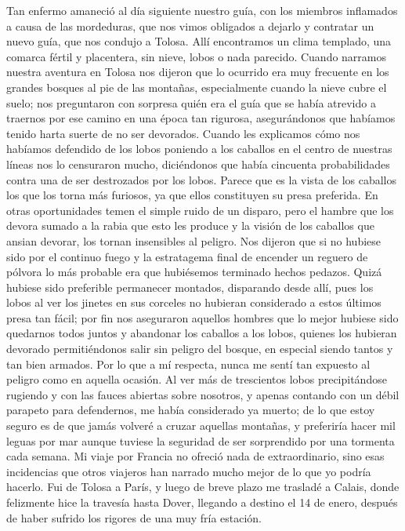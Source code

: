 \documentclass{novela}
\begin{document}
    Tan enfermo amaneció al día siguiente nuestro guía, con los miembros inflamados a causa de las mordeduras, que nos vimos obligados a dejarlo y contratar un nuevo guía, que nos condujo a Tolosa. Allí encontramos un clima templado, una comarca fértil y placentera, sin nieve, lobos o nada parecido. Cuando narramos nuestra aventura en Tolosa nos dijeron que lo ocurrido era muy frecuente en los grandes bosques al pie de las montañas, especialmente cuando la nieve cubre el suelo; nos preguntaron con sorpresa quién era el guía que se había atrevido a traernos por ese camino en una época tan rigurosa, asegurándonos que habíamos tenido harta suerte de no ser devorados. Cuando les explicamos cómo nos habíamos defendido de los lobos poniendo a los caballos en el centro de nuestras líneas nos lo censuraron mucho, diciéndonos que había cincuenta probabilidades contra una de ser destrozados por los lobos. Parece que es la vista de los caballos los que los torna más furiosos, ya que ellos constituyen su presa preferida. En otras oportunidades temen el simple ruido de un disparo, pero el hambre que los devora sumado a la rabia que esto les produce y la visión de los caballos que ansian devorar, los tornan insensibles al peligro. Nos dijeron que si no hubiese sido por el continuo fuego y la estratagema final de encender un reguero de pólvora lo más probable era que hubiésemos terminado hechos pedazos. Quizá hubiese sido preferible permanecer montados, disparando desde allí, pues los lobos al ver los jinetes en sus corceles no hubieran considerado a estos últimos presa tan fácil; por fin nos aseguraron aquellos hombres que lo mejor hubiese sido quedarnos todos juntos y abandonar los caballos a los lobos, quienes los hubieran devorado permitiéndonos salir sin peligro del bosque, en especial siendo tantos y tan bien armados.
    Por lo que a mí respecta, nunca me sentí tan expuesto al peligro como en aquella ocasión. Al ver más de trescientos lobos precipitándose rugiendo y con las fauces abiertas sobre nosotros, y apenas contando con un débil parapeto para defendernos, me había considerado ya muerto; de lo que estoy seguro es de que jamás volveré a cruzar aquellas montañas, y preferiría hacer mil leguas por mar aunque tuviese la seguridad de ser sorprendido por una tormenta cada semana.
    Mi viaje por Francia no ofreció nada de extraordinario, sino esas incidencias que otros viajeros han narrado mucho mejor de lo que yo podría hacerlo. Fui de Tolosa a París, y luego de breve plazo me trasladé a Calais, donde felizmente hice la travesía hasta Dover, llegando a destino el 14 de enero, después de haber sufrido los rigores de una muy fría estación.
\end{document}
